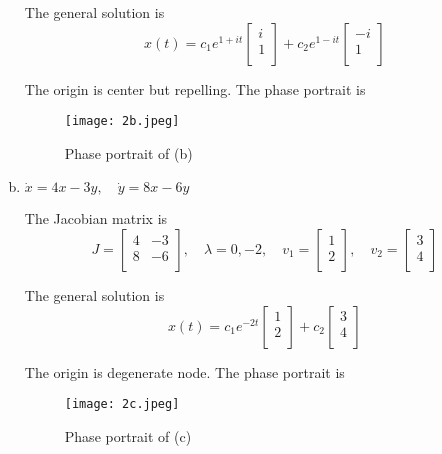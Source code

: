 \documentclass[12pt]{exam}
\begin{document}
\begin{enumerate}[(a)]
	The general solution is
	\[ x(t) = c_1e^{1+it} \begin{bmatrix}
		i \\
		1 \\
		\end{bmatrix} + c_2e^{1-it} \begin{bmatrix}
	-i \\
	1 \\
	\end{bmatrix} \]
	
	The origin is center but repelling. The phase portrait is

	\begin{figure}[H]
		\centering
		\texttt{[image: 2b.jpeg]}
		\caption{Phase portrait of (b)}
		\label{fig:2b}
	\end{figure}

	\item $\dot{x} = 4x-3y, \quad \dot{y} = 8x-6y$

	The Jacobian matrix is
	\[ J = \begin{bmatrix}
		4 & -3 \\
		8 & -6 \\
	\end{bmatrix} , \quad \lambda = 0, -2 , \quad v_1= \begin{bmatrix}
	1 \\
	2 \\
	\end{bmatrix} , \quad v_2 = \begin{bmatrix}
	3 \\
	4 \\
	\end{bmatrix} \]

	The general solution is
	\[ x(t) = c_1e^{-2t} \begin{bmatrix}
		1 \\
		2 \\
		\end{bmatrix} + c_2 \begin{bmatrix}
		3 \\
		4 \\
		\end{bmatrix} \]
	
	The origin is degenerate node. The phase portrait is

	\begin{figure}[H]
		\centering
		\texttt{[image: 2c.jpeg]}
		\caption{Phase portrait of (c)}
		\label{fig:2c}
	\end{figure}


\end{enumerate}
\end{document}
